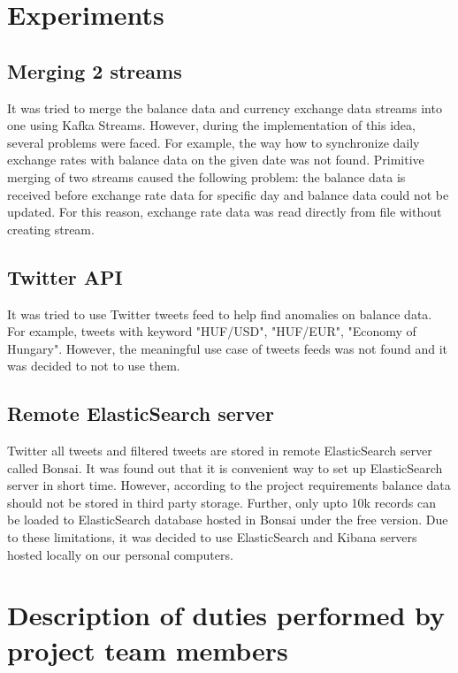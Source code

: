 \documentclass{article}
\begin{document}
\section{Experiments}

\subsection{Merging 2 streams}

It was tried to merge the balance data and currency exchange data streams into one using Kafka Streams. However, during the implementation of this idea, several problems were faced. For example, the way how to synchronize daily exchange rates with balance data on the given date was not found. Primitive merging of two streams caused the following problem: the balance data is received before exchange rate data for specific day and balance data could not be updated. For this reason, exchange rate data was read directly from file without creating stream. 

\subsection{Twitter API}

It was tried to use Twitter tweets feed to help find anomalies on balance data. For example, tweets with keyword "HUF/USD", "HUF/EUR", "Economy of Hungary". However, the meaningful use case of tweets feeds was not found and it was decided to not to use them.

\subsection{Remote ElasticSearch server}

Twitter all tweets and filtered tweets are stored in remote ElasticSearch server called Bonsai. It was found out that it is convenient way to set up ElasticSearch server in short time. However, according to the project requirements balance data should not be stored in third party storage. Further, only upto 10k records can be loaded to ElasticSearch database hosted in Bonsai under the free version. Due to these limitations, it was decided to use ElasticSearch and Kibana servers hosted locally on our personal computers. 
\section{Description of duties performed by project team members}
\end{document}
